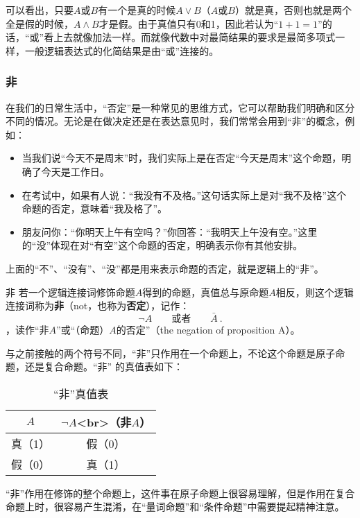 可以看出，只要$A$或$B$有一个是真的时候$A\lor B$（$A$或$B$）就是真，否则也就是两个全是假的时候，$A\land B$才是假。由于真值只有0和1，因此若认为“$1+1=1$”的话，“或”看上去就像加法一样。而就像代数中对最简结果的要求是最简多项式一样，一般逻辑表达式的化简结果是由“或”连接的。

\subsubsection{非}

在我们的日常生活中，“否定”是一种常见的思维方式，它可以帮助我们明确和区分不同的情况。无论是在做决定还是在表达意见时，我们常常会用到“非”的概念，例如：
\begin{itemize}
\item 当我们说“今天不是周末”时，我们实际上是在否定“今天是周末”这个命题，明确了今天是工作日。
\item 在考试中，如果有人说：“我没有不及格。”这句话实际上是对“我不及格”这个命题的否定，意味着“我及格了”。
\item 朋友问你：“你明天上午有空吗？”你回答：“我明天上午没有空。”这里的“没”体现在对“有空”这个命题的否定，明确表示你有其他安排。
\end{itemize}

上面的“不”、“没有”、“没”都是用来表示命题的否定，就是逻辑上的“非”。

\begin{definition}{非}
若一个逻辑连接词修饰命题$A$得到的命题，真值总与原命题$A$相反，则这个逻辑连接词称为\textbf{非}（not，也称为\textbf{否定}），记作：
\begin{equation}
\lnot A\qquad\text{或者}\qquad\bar{A}~.
\end{equation}
，读作“非$A$”或“（命题）$A$的否定”（the negation of proposition A）。
\end{definition}

与之前接触的两个符号不同，“非”只作用在一个命题上，不论这个命题是原子命题，还是复合命题。“非” 的真值表如下：

\begin{table}[ht]
\centering
\caption{“非”真值表}\label{tab_HsCoPr3}
\begin{tabular}{|c|c|}
\hline
$A$ & $\lnot A$<br>（非$A$） \\
\hline
真（1） & 假（0） \\
\hline
假（0） & 真（1） \\
\hline
\end{tabular}
\end{table}

“非”作用在修饰的整个命题上，这件事在原子命题上很容易理解，但是作用在复合命题上时，很容易产生混淆，在“量词命题”和“条件命题”中需要提起精神注意。

